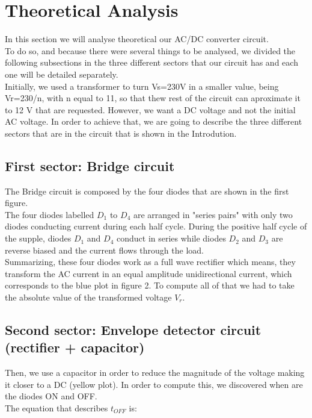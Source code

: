 \section{Theoretical Analysis}
\label{sec:analysis}

In this section we will analyse theoretical our AC/DC converter circuit. \\
To do so, and because there were several things to be analysed, we divided the following subsections in the three different sectors that our circuit has and each one will be detailed separately.\\
Initially, we used a transformer to turn Vs=230V in a smaller value, being Vr=230/n, with n equal to 11, so that thew
rest of the circuit can aproximate it to 12 V that are requested. However, we want a DC voltage and not the initial AC voltage. In order
to achieve that, we are going to describe the three different sectors that are in the circuit that is shown in the Introdution.\\


\subsection{First sector: Bridge circuit}

The Bridge circuit is composed by the four diodes that are shown in the first figure.\\
The four diodes labelled $D_1$ to $D_4$ are arranged in "series pairs" with only two diodes conducting current during each half cycle. During the positive half cycle of the supple, diodes $D_1$ and $D_4$ conduct in series while diodes $D_2$ and $D_3$ are reverse biased and the current flows through the load.\\
Summarizing, these four diodes work as a full wave rectifier which means, they transform the AC current in an equal
amplitude unidirectional current, which corresponds to the blue plot in figure 2. To compute all of that we had to take the absolute value of the transformed voltage $V_r$.

\subsection{Second sector: Envelope detector circuit (rectifier + capacitor)}

Then, we use a capacitor in order to reduce the magnitude of the voltage making it closer to a DC (yellow plot).
In order to compute this, we discovered when are the diodes ON and OFF.\\
The equation that describes $t_{OFF}$ is:

